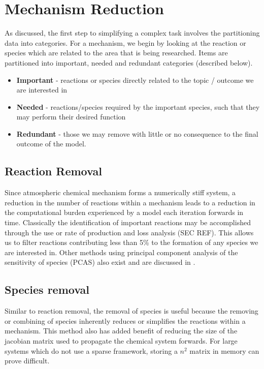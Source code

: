 
\section{Mechanism Reduction}

As discussed, the first step to simplifying a complex task involves the partitioning data into categories. For a mechanism, we begin by looking at the reaction or species which are related to the area that is being researched. Items are partitioned into important, needed and redundant categories (described below). 

\begin{itemize}
    \item \textbf{Important} - reactions or species directly related to the topic / outcome we are interested in
    \item \textbf{Needed} - reactions/species required by the important species, such that they may perform their desired function
    \item \textbf{Redundant} - those we may remove with little or no consequence to the final outcome of the model. 
\end{itemize}



\subsection{Reaction Removal}
Since atmospheric chemical mechanism forms a numerically stiff system, a reduction in the number of reactions within a mechanism leads to a reduction in the computational burden experienced by a model each iteration forwards in time. Classically the identification of important reactions may be accomplished through the use or rate of production and loss analysis (SEC REF). This allows us to filter reactions contributing less than 5\% to the formation of any species we are interested in. Other methods using principal component analysis of the sensitivity of species (PCAS) also exist and are discussed in \cite{PCAS}.


\subsection{Species removal}
Similar to reaction removal, the removal of species is useful because the removing or combining of species inherently reduces or simplifies the reactions within a mechanism.  This method also has added benefit of reducing the size of the jacobian matrix used to propagate the chemical system forwards. For large systems which do not use a sparse framework, storing a $n^2$ matrix in memory can prove difficult.

